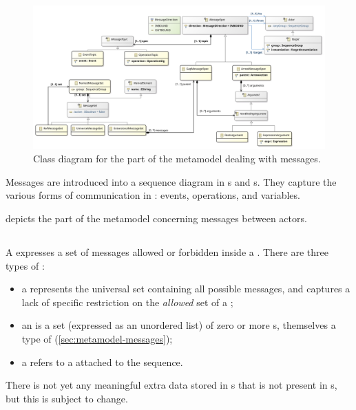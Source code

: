 \begin{figure}[htb]
	\centering
	\includegraphics[width=\textwidth]{diagrams/Messages}
	\caption{Class diagram for the part of the \langname{} metamodel dealing with messages.}
	\label{fig:metamodel-messages}
\end{figure}

\noindent
Messages are introduced into a sequence diagram
in \mmessageset s and \marrowaction s.  They capture the various forms of
communication in \robochart: events, operations, and 
variables.

 depicts the part of the metamodel concerning
messages between actors.

\subsection{\mmessageset}\label{ssec:metamodel-messages-sets}

A \mmessageset{} expresses a set of messages allowed or forbidden
inside a \msequencegap.  There are three types of \mmessageset:

\begin{itemize}
\item
  a \muniversemessageset{} represents the universal set containing 
  all possible messages, and
  captures a lack of specific restriction on
  the \emph{allowed} set of a \msequencegap;
\item	
  an \mextensionalmessageset{} is a set (expressed as an unordered list) of
  zero or more \mgapmessagespec s, themselves
  a type of \mmessagespec{} (\cref{sec:metamodel-messages});
\item
  a \mrefmessageset{} refers to a \mnamedmessageset{} attached to the
  sequence.
\end{itemize}

There is not yet any meaningful extra data stored in
\mgapmessagespec s that is not present in \mmessagespec s, but this is subject
to change.

